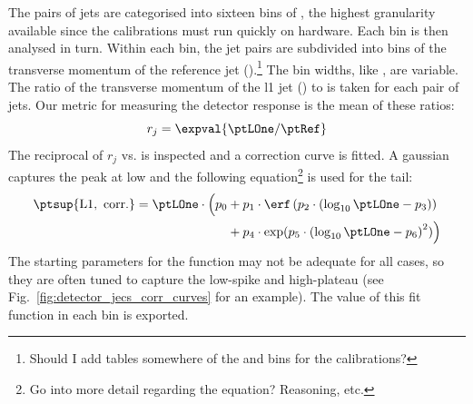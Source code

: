 The pairs of \glspl{jet} are categorised into sixteen bins of \abseta, the highest granularity available since the calibrations must run quickly on hardware. Each bin is then analysed in turn. Within each \abseta bin, the \gls{jet} pairs are subdivided into bins of the transverse momentum of the reference \gls{jet} (\ptRef).\footnote{Should I add tables somewhere of the \ptRef and \abseta bins for the calibrations?} The bin widths, like \abseta, are variable. The ratio of the transverse momentum of the \acrshort{l1} \gls{jet} (\ptLOne) to \ptRef is taken for each pair of \glspl{jet}. Our metric for measuring the detector response is the mean of these ratios:
\begin{equation}
    r_j = \expval{\ptLOne / \ptRef}
    \label{eq:jec_detector_response}
\end{equation}
The reciprocal of $r_j$ vs. \ptLOne is inspected and a correction curve is fitted. A gaussian captures the peak at low \pt and the following equation\footnote{Go into more detail regarding the equation? Reasoning, etc.} is used for the tail:
\begin{equation} %
    \begin{aligned}
\ptsup{{\mathrm{L1, \ corr.}}} = \ptLOne \cdot \Big( p_0 &+ p_1 \cdot \erf \left(p_2 \cdot \left( \log_{10}\ptLOne - p_3 \right) \right) \\
&+ p_4 \cdot \exp(p_5 \cdot \left( \log_{10}\ptLOne - p_6 \right)^2 ) \Big)
    \end{aligned}
    \label{eq:corr_curve_jec_tail}
\end{equation}
The starting parameters for the function may not be adequate for all cases, so they are often tuned to capture the low-\pt spike and high-\pt plateau (see Fig.~\ref{fig:detector_jecs_corr_curves} for an example). The value of this fit function in each \ptRef bin is exported.


